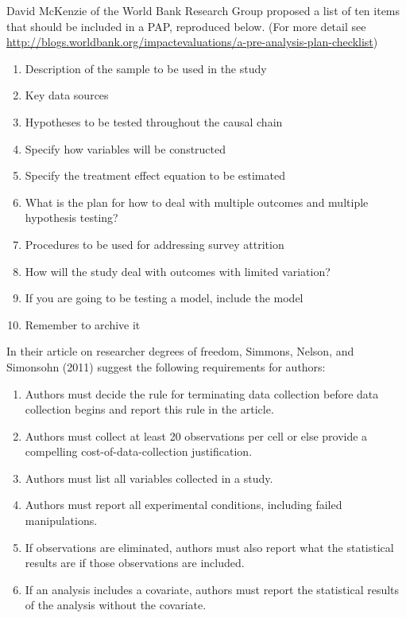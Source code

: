 \documentclass[12pt] {article}
\begin{document}
David McKenzie of the World Bank Research Group proposed a list of ten
items that should be included in a PAP, reproduced below. (For more
detail see
\url{http://blogs.worldbank.org/impactevaluations/a-pre-analysis-plan-checklist})

\begin{enumerate}
\item
  Description of the sample to be used in the study
\item
  Key data sources
\item
  Hypotheses to be tested throughout the causal chain
\item
  Specify how variables will be constructed
\item
  Specify the treatment effect equation to be estimated
\item
  What is the plan for how to deal with multiple outcomes and multiple
  hypothesis testing?
\item
  Procedures to be used for addressing survey attrition
\item
  How will the study deal with outcomes with limited variation?
\item
  If you are going to be testing a model, include the model
\item
  Remember to archive it
\end{enumerate}

In their article on researcher degrees of freedom, Simmons, Nelson, and
Simonsohn (2011) suggest the following requirements for authors:

\begin{enumerate}
\def\labelenumi{\arabic{enumi}.}
\item
  Authors must decide the rule for terminating data collection before
  data collection begins and report this rule in the article.
\item
  Authors must collect at least 20 observations per cell or else provide
  a compelling cost-of-data-collection justification.
\item
  Authors must list all variables collected in a study.
\item
  Authors must report all experimental conditions, including failed
  manipulations.
\item
  If observations are eliminated, authors must also report what the
  statistical results are if those observations are included.
\item
  If an analysis includes a covariate, authors must report the
  statistical results of the analysis without the covariate.
\end{enumerate}
\end{document}
